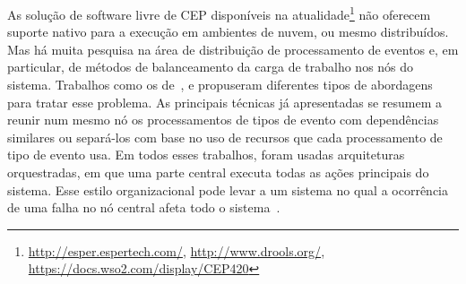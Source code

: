 As solução de software livre de CEP disponíveis na atualidade\footnote{ \url{http://esper.espertech.com/},  \url{http://www.drools.org/},  \url{https://docs.wso2.com/display/CEP420}} %
não oferecem suporte nativo para a execução em ambientes de nuvem, ou mesmo distribuídos.
Mas há muita pesquisa na área de distribuição de processamento de eventos e, em particular, de métodos de balanceamento da carga de trabalho nos nós do sistema. Trabalhos como os de~\cite{Isoyama:2012:SCE:2335484.2335498}, \cite{6906776} e \cite{Balkesen:2013:RRI:2488222.2488257} propuseram diferentes tipos de abordagens para tratar esse problema. As principais técnicas já apresentadas
se resumem a reunir num mesmo nó os processamentos de tipos de evento com dependências similares ou separá-los com base no uso de recursos que cada processamento de tipo de evento usa. Em todos esses trabalhos, foram usadas  arquiteturas orquestradas, em que uma parte central executa todas as ações principais do sistema. Esse estilo organizacional pode levar a um sistema no qual a ocorrência de uma falha no nó central afeta todo o sistema~\citep{Newman:2015:BM:2904388}. 








